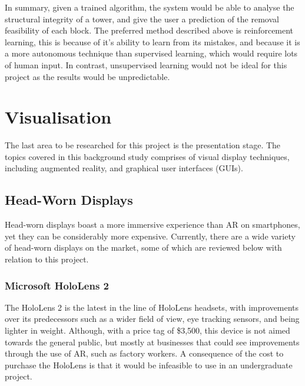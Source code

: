 In summary, given a trained algorithm, the system would be able to analyse the structural integrity of a \jenga{} tower, and give the user a prediction of the removal feasibility of each block. The preferred method described above is reinforcement learning, this is because of it's ability to learn from its mistakes, and because it is a more autonomous technique than supervised learning, which would require lots of human input. In contrast, unsupervised learning would not be ideal for this project as the results would be unpredictable.


\section{Visualisation}

The last area to be researched for this project is the presentation stage. The topics covered in this background study comprises of visual display techniques, including augmented reality, and graphical user interfaces (GUIs).


\subsection{Head-Worn Displays}

Head-worn displays boast a more immersive experience than AR on smartphones, yet they can be considerably more expensive. Currently, there are a wide variety of head-worn displays on the market, some of which are reviewed below with relation to this project.

\subsubsection{Microsoft HoloLens 2}
The HoloLens 2 \citep{hololens2} is the latest in the line of HoloLens headsets, with improvements over its predecessors such as a wider field of view, eye tracking sensors, and being lighter in weight. Although, with a price tag of \$3,500, this device is not aimed towards the general public, but mostly at businesses that could see improvements through the use of AR, such as factory workers. A consequence of the cost to purchase the HoloLens is that it would be infeasible to use in an undergraduate project.

